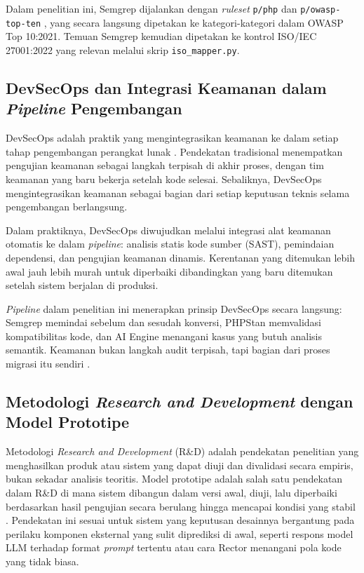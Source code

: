     Dalam penelitian ini, Semgrep dijalankan dengan \textit{ruleset} \texttt{p/php} dan \texttt{p/owasp-}
    \texttt{top-ten} \cite{semgrep2024}, yang secara langsung dipetakan ke kategori-kategori dalam OWASP Top 10:2021. Temuan Semgrep kemudian dipetakan ke kontrol ISO/IEC 27001:2022 yang relevan melalui skrip \texttt{iso\_mapper.py}.

    \subsection{DevSecOps dan Integrasi Keamanan dalam \textit{Pipeline} Pengembangan}

DevSecOps adalah praktik yang mengintegrasikan keamanan ke dalam setiap tahap pengembangan perangkat lunak \cite{iso27001_2022}. Pendekatan tradisional menempatkan pengujian keamanan sebagai langkah terpisah di akhir proses, dengan tim keamanan yang baru bekerja setelah kode selesai. Sebaliknya, DevSecOps mengintegrasikan keamanan sebagai bagian dari setiap keputusan teknis selama pengembangan berlangsung.

Dalam praktiknya, DevSecOps diwujudkan melalui integrasi alat keamanan otomatis ke dalam \textit{pipeline}: analisis statis kode sumber (SAST), pemindaian dependensi, dan pengujian keamanan dinamis. Kerentanan yang ditemukan lebih awal jauh lebih murah untuk diperbaiki dibandingkan yang baru ditemukan setelah sistem berjalan di produksi.

    \textit{Pipeline} dalam penelitian ini menerapkan prinsip DevSecOps secara langsung: Semgrep memindai sebelum dan sesudah konversi, PHPStan memvalidasi kompatibilitas kode, dan AI Engine menangani kasus yang butuh analisis semantik. Keamanan bukan langkah audit terpisah, tapi bagian dari proses migrasi itu sendiri \cite{iso27001_2022}.

    \subsection{Metodologi \textit{Research and Development} 
    dengan Model Prototipe}
    \label{subsec:model-prototipe}

    Metodologi \textit{Research and Development} (R\&D) adalah 
    pendekatan penelitian yang menghasilkan produk atau sistem 
    yang dapat diuji dan divalidasi secara empiris, bukan sekadar 
    analisis teoritis. Model prototipe adalah salah satu pendekatan 
    dalam R\&D di mana sistem dibangun dalam versi awal, diuji, 
    lalu diperbaiki berdasarkan hasil pengujian secara berulang 
    hingga mencapai kondisi yang stabil \cite{pressman2019}. 
    Pendekatan ini sesuai untuk sistem yang keputusan desainnya 
    bergantung pada perilaku komponen eksternal yang sulit 
    diprediksi di awal, seperti respons model LLM terhadap format 
    \textit{prompt} tertentu atau cara Rector menangani pola kode 
    yang tidak biasa.

